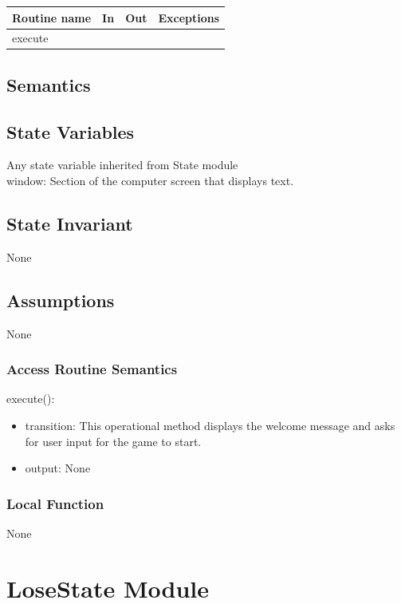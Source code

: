 \documentclass[12pt]{article}
\begin{document}
\begin{tabular}{| l | l | l | p{6cm} |}
\hline
\textbf{Routine name} & \textbf{In} & \textbf{Out} & \textbf{Exceptions}\\
\hline
execute & ~ & ~ & ~ \\
\hline
\end{tabular}

\subsection* {Semantics}

\subsection*{State Variables}

Any state variable inherited from State module\\
window: Section of the computer screen that displays text.

\subsection*{State Invariant}

None

\subsection*{Assumptions}

None

\subsubsection* {Access Routine Semantics}

execute():
\begin{itemize}
\item transition: This operational method displays the welcome message and asks for user input for the game to start.
\item output: None
\end{itemize}

\subsubsection* {Local Function}

None

\newpage

\section* {LoseState Module}
\end{document}

